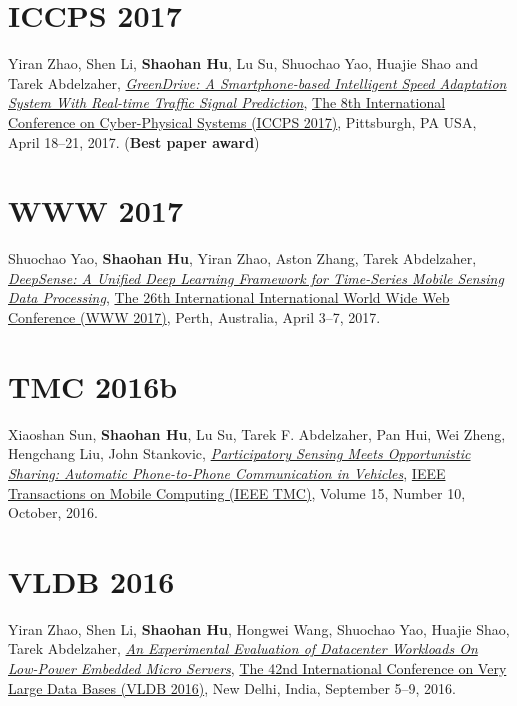 \section{\sc ICCPS 2017}\hypertarget{zhao2017iccps}{}
Yiran Zhao, Shen Li, \textbf{Shaohan Hu}, Lu Su, Shuochao Yao, Huajie Shao and Tarek Abdelzaher,
\href{http://dl.acm.org/citation.cfm?id=3055009}{\emph{GreenDrive: A Smartphone-based Intelligent Speed Adaptation System With Real-time Traffic Signal Prediction}},
\href{http://iccps2017.cse.wustl.edu}{\textsf{The 8th International Conference on Cyber-Physical Systems (ICCPS 2017)}},
Pittsburgh, PA USA, April 18--21, 2017. (\textbf{Best paper award})

\section{\sc WWW 2017}\hypertarget{yao2017www}{}
Shuochao Yao, \textbf{Shaohan Hu}, Yiran Zhao, Aston Zhang, Tarek Abdelzaher,
\href{http://dl.acm.org/citation.cfm?id=3052577}{\emph{DeepSense: A Unified Deep Learning Framework for Time-Series Mobile Sensing Data Processing}},
\href{http://www.www2017.com.au/}{\textsf{The 26th International International World Wide Web Conference (WWW 2017)}},
Perth, Australia, April 3--7, 2017.

\section{\sc TMC 2016b}\hypertarget{hu2015tmc}{}
Xiaoshan Sun, \textbf{Shaohan Hu}, Lu Su, Tarek F. Abdelzaher, Pan Hui, Wei Zheng, Hengchang Liu, John Stankovic,
\href{http://ieeexplore.ieee.org/document/7337442}{\emph{Participatory Sensing Meets Opportunistic Sharing: Automatic Phone-to-Phone Communication in Vehicles}},
\href{http://www.computer.org/web/tmc}{\textsf{IEEE Transactions on Mobile Computing (IEEE TMC)}},
Volume 15, Number 10, October, 2016.

\section{\sc VLDB 2016}\hypertarget{zhao2016vldb}{}
Yiran Zhao, Shen Li, \textbf{Shaohan Hu}, Hongwei Wang, Shuochao Yao, Huajie Shao, Tarek Abdelzaher,
\href{http://dl.acm.org/citation.cfm?id=2947625}{\emph{An Experimental Evaluation of Datacenter Workloads On Low-Power Embedded Micro Servers}},
\href{http://vldb2016.persistent.com/}{\textsf{The 42nd International Conference on Very Large Data Bases (VLDB 2016)}},
New Delhi, India, September 5--9, 2016.

